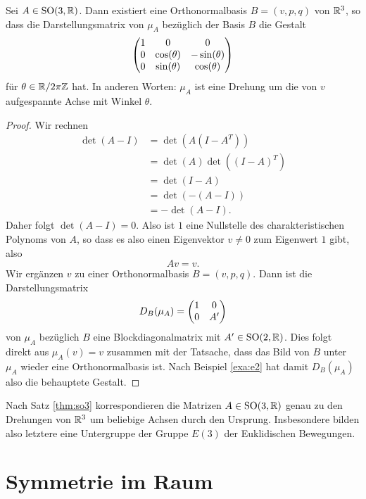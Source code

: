 \documentclass{book}
\begin{document}
\begin{thm}
    \label{thm:so3} Sei $A \in \operatorname{SO}(3,\mathbb{R})$. Dann existiert eine
    Orthonormalbasis $B = (v, p, q)$ von $\mathbb{R}^3$, so dass die Darstellungsmatrix von $\mu_A$ bezüglich der Basis $B$ die Gestalt
    \[
        \begin{pmatrix}  1 & 0 & 0\\ 0 & \cos(\theta) & -\sin(\theta)\\ 0 & \sin(\theta) & \cos(\theta)  \end{pmatrix}
    \]
    für $\theta \in \mathbb{R}/ 2 \pi \mathbb{Z}$ hat. In anderen Worten: $\mu_A$ ist eine
    Drehung um die von $v$ aufgespannte Achse mit Winkel $\theta$. 
\end{thm}
\begin{proof}
    Wir rechnen
    \begin{align}
        \det( A - I) & = \det( A (I - A^T) ) \\
                     & = \det(A) \det((I-A)^T)\\
                     & = \det(I-A)\\
                     & = \det(-(A-I))\\
                     & = - \det(A-I).
    \end{align}
    Daher folgt $\det(A-I) = 0$. Also ist $1$ eine Nullstelle des
    charakteristischen Polynoms von $A$, so dass es also einen Eigenvektor $v
    \ne 0$ zum Eigenwert $1$ gibt, also 
    \[
        A v = v.
    \]
    Wir ergänzen $v$ zu einer Orthonormalbasis $B = (v, p, q)$. Dann ist die Darstellungsmatrix 
    \[
        D_{B}(\mu_A) = \begin{pmatrix}  1 & 0\\
        0 & A'  \end{pmatrix}
    \]
    von $\mu_A$ bezüglich $B$ eine Blockdiagonalmatrix mit $A' \in
    \operatorname{SO}(2,\mathbb{R})$. Dies folgt direkt aus $\mu_A(v) = v$ zusammen mit der
    Tatsache, dass das Bild von $B$ unter $\mu_A$ wieder eine Orthonormalbasis
    ist. Nach Beispiel \ref{exa:e2} hat damit $D_B(\mu_A)$ also die behauptete Gestalt.
\end{proof}

\begin{rem}
    \label{rem:drehungen}
    Nach Satz \ref{thm:so3} korrespondieren die Matrizen $A \in
    \operatorname{SO}(3,\mathbb{R})$ genau zu den Drehungen von $\mathbb{R}^3$ um beliebige Achsen durch
    den Ursprung. Insbesondere bilden also letztere eine Untergruppe der Gruppe
    $E(3)$ der Euklidischen Bewegungen. 
\end{rem}

\section{Symmetrie im Raum}%
\label{sec:symmetrie_im_raum}
\end{document}
